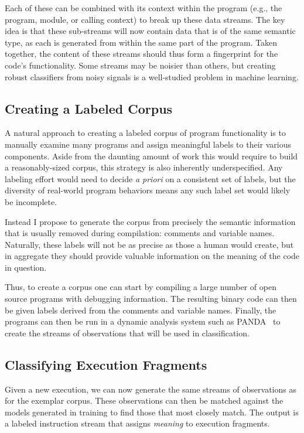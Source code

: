 \documentclass{article}
\begin{document}
Each of these can be combined with its context within the program (e.g.,
the program, module, or calling context) to break up these data streams.
The key idea is that these sub-streams will now contain data that is of
the same semantic type, as each is generated from within the same part
of the program. Taken together, the content of these streams should thus
form a fingerprint for the code's functionality. Some streams may be
noisier than others, but creating robust classifiers from noisy signals
is a well-studied problem in machine learning.

\subsection{Creating a Labeled Corpus}

A natural approach to creating a labeled corpus of program functionality
is to manually examine many programs and assign meaningful labels to
their various components. Aside from the daunting amount of work this
would require to build a reasonably-sized corpus, this strategy is also
inherently underspecified. Any labeling effort would need to decide
\emph{a priori} on a consistent set of labels, but the diversity of
real-world program behaviors means any such label set would likely be
incomplete.

Instead I propose to generate the corpus from precisely the semantic
information that is usually removed during compilation: comments and
variable names. Naturally, these labels will not be as precise as those
a human would create, but in aggregate they should provide valuable
information on the meaning of the code in question.

Thus, to create a corpus one can start by compiling a large number of
open source programs with debugging information. The resulting binary
code can then be given labels derived from the comments and variable
names. Finally, the programs can then be run in a dynamic analysis
system such as PANDA~\cite{panda} to create the streams of observations
that will be used in classification.

\subsection{Classifying Execution Fragments}

Given a new execution, we can now generate the same streams of
observations as for the exemplar corpus. These observations can then be
matched against the models generated in training to find those that most
closely match. The output is a labeled instruction stream that assigns
\emph{meaning} to execution fragments.
\end{document}
